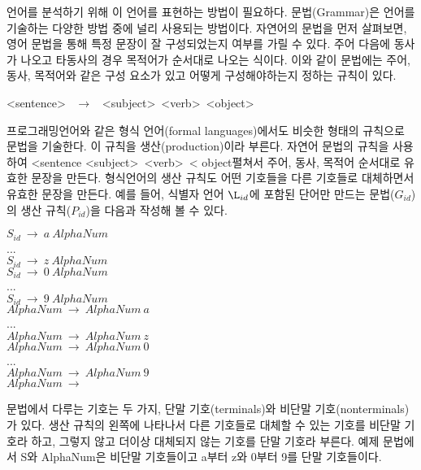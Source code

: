 \documentclass[a4paper]{book}
\begin{document}
언어를 분석하기 위해 이 언어를 표현하는 방법이
필요하다. 문법(Grammar)은 언어를 기술하는 다양한 방법 중에 널리
사용되는 방법이다. 자연어의 문법을 먼저 살펴보면, 영어 문법을 통해
특정 문장이 잘 구성되었는지 여부를 가릴 수 있다. 주어 다음에 동사가
나오고 타동사의 경우 목적어가 순서대로 나오는 식이다. 이와 같이
문법에는 주어, 동사, 목적어와 같은 구성 요소가 있고 어떻게
구성해야하는지 정하는 규칙이 있다.

\begin{center}
  \textless sentence\textgreater
  \ $\rightarrow$ \ 
  \textless subject\textgreater \ 
  \textless verb\textgreater \ 
  \textless object\textgreater
\end{center}

프로그래밍언어와 같은 형식 언어(formal languages)에서도 비슷한 형태의
규칙으로 문법을 기술한다. 이 규칙을 생산(production)이라
부른다.
%
자연어 문법의 규칙을 사용하여 \textless sentence
\textless subject\textgreater \ \textless verb\textgreater \ \textless
object 펼쳐서 주어, 동사, 목적어 순서대로 유효한 문장을
만든다.
%  
형식언어의 생산 규칙도 어떤 기호들을 다른 기호들로 대체하면서 유효한
문장을 만든다.
%
예를 들어, 식별자 언어 $\L_{id}$에 포함된 단어만 만드는 문법($G_{id}$)의 생산
규칙($P_{id}$)을 다음과 작성해 볼 수 있다.
\begin{center}
  $S_{id} \ \rightarrow \ a \ AlphaNum$ \\
  ... \\
  $S_{id} \ \rightarrow \ z \ AlphaNum$ \\
  $S_{id} \ \rightarrow \ 0 \ AlphaNum$ \\
  ... \\
  $S_{id} \ \rightarrow \ 9 \ AlphaNum$ \\
  $AlphaNum \ \rightarrow \ AlphaNum \ a$ \\
  ... \\
  $AlphaNum \ \rightarrow \ AlphaNum \ z$ \\
  $AlphaNum \ \rightarrow \ AlphaNum \ 0$ \\
  ... \\
  $AlphaNum \ \rightarrow \ AlphaNum \ 9$ \\
  $AlphaNum \ \rightarrow \ $
\end{center}


문법에서 다루는 기호는 두 가지, 단말 기호(terminals)와 비단말
기호(nonterminals)가 있다.  생산 규칙의 왼쪽에 나타나서 다른 기호들로
대체할 수 있는 기호를 비단말 기호라 하고, 그렇지 않고 더이상 대체되지
않는 기호를 단말 기호라 부른다.  예제 문법에서 S와 AlphaNum은 비단말
기호들이고 a부터 z와 0부터 9를 단말 기호들이다.
\end{document}
